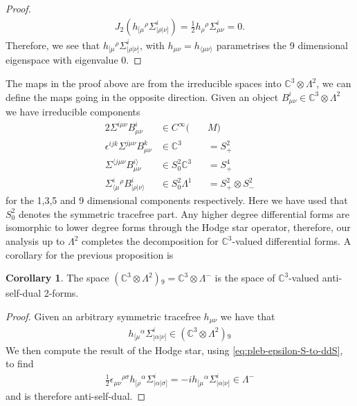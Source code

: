 \documentclass[10pt]{report}
\theoremstyle{definition}
\newtheorem{corollary}{Corollary}[chapter]
\newcommand{\C}[0]{\mathbb{C}}
\newcommand{\E}[0]{\C^3}
\begin{document}
\begin{proof}
    \begin{align}
        J_2(h_{[\mu}{}^\rho \Sigma^i_{|\rho|\nu]}) = \frac{1}{2} h_\rho{}^\rho \Sigma^i_{\mu\nu} = 0.
    \end{align}
    Therefore, we see that $h_{[\mu}{}^\rho \Sigma^i_{|\rho|\nu]}$, with $h_{\mu\nu} = h_{\langle \mu\nu\rangle }$ parametrises the 9 dimensional eigenspace with eigenvalue 0.
\end{proof}

The maps in the proof above are from the irreducible spaces into $\E \otimes \Lambda^2$, we can define the maps going in the opposite direction. Given an object $B^i_{\mu\nu} \in \E \otimes \Lambda^2$ we have irreducible components 
\begin{alignat}{2}
    \Sigma^{i\mu\nu} B^i_{\mu\nu} &\in C^\infty( && M)  \\
    \epsilon^{ijk} \Sigma^{j\mu\nu} B^k_{\mu\nu} &\in \E && = S_+^2 \\
    \Sigma^{\langle j \mu\nu} B^{i\rangle }_{\mu\nu} &\in S^2_0 \E && = S_+^4 \\
    \Sigma^i_{\langle \mu}{}^\rho B^i_{|\rho|\nu\rangle } &\in S^2_0 \Lambda^1 && = S_+^2 \otimes S_-^2
\end{alignat}
for the 1,3,5 and 9 dimensional components respectively. Here we have used that $S^2_0$ denotes the symmetric tracefree part. Any higher degree differential forms are isomorphic to lower degree forms through the Hodge star operator, therefore, our analysis up to $\Lambda^2$ completes the decomposition for $\E$-valued differential forms. A corollary for the previous proposition is 
\begin{corollary}\label{col:pleb-E-Lambda2-9-is-ASD-2-forms}
    The space $(\E \otimes \Lambda^2){}_9 = \C^3 \otimes \Lambda^-$ is the space of $\C^3$-valued anti-self-dual 2-forms.
\end{corollary} 
\begin{proof}
    Given an arbitrary symmetric tracefree $h_{\mu\nu}$ we have that 
    \begin{align}
        h_{[\mu}{}^\alpha \Sigma^i_{|\alpha|\nu]} \in (\E \otimes \Lambda^2){}_9
    \end{align}
    We then compute the result of the Hodge star, using \cref{eq:pleb-epsilon-S-to-ddS}, to find
    \begin{align}
        \frac{1}{2} \epsilon_{\mu\nu}{}^{\rho\sigma} h_{[\rho}{}^\alpha \Sigma^i_{|\alpha|\sigma]} = -i h_{[\mu}{}^\alpha \Sigma^i_{|\alpha|\nu]} \in \Lambda^-
    \end{align}
    and is therefore anti-self-dual.
\end{proof}
\end{document}

